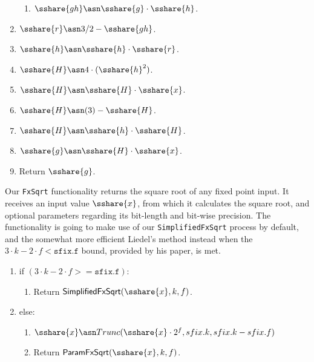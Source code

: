 \begin{enumerate}
\begin{enumerate}
          \item $\sshare{gh} \asn \sshare{g} \cdot \sshare{h}$.
        \end{enumerate}
  \item $\sshare{r} \asn 3/2-\sshare{gh}$.
  \item $\sshare{h} \asn \sshare{h} \cdot \sshare{r}$.
  \item $\sshare{H} \asn 4 \cdot (\sshare{h}^2)$.
  \item $\sshare{H} \asn \sshare{H}\cdot \sshare{x}$.
  \item $\sshare{H} \asn (3) - \sshare{H}$.
  \item $\sshare{H} \asn \sshare{h} \cdot \sshare{H}$.
  \item $\sshare{g} \asn \sshare{H} \cdot \sshare{x}$.
  \item Return $\sshare{g}$.
\end{enumerate}

Our \verb|FxSqrt| functionality returns the square root of any fixed point input. It receives an input value $\sshare{x}$, from which it calculates the square root, and optional parameters regarding its bit-length and bit-wise precision. The functionality is going to make use of our \verb|SimplifiedFxSqrt| process by default, and the somewhat more efficient Liedel's method instead when the $3 \cdot k - 2 \cdot f < \mathtt{sfix.f}$ bound, provided by his paper, is met.

\begin{enumerate}
  \item if $(3 \cdot k - 2 \cdot f >= \mathtt{sfix.f})$:
        \begin{enumerate}
          \item Return $\mathsf{SimplifiedFxSqrt}(\sshare{x}, k, f)$.
        \end{enumerate}
  \item else:
        \begin{enumerate}
          \item $\sshare{x} \asn Trunc(\sshare{x} \cdot 2^{f}, sfix.k, sfix.k-sfix.f)$
          \item Return $\mathsf{ParamFxSqrt}(\sshare{x}, k, f)$.
        \end{enumerate}
\end{enumerate}

